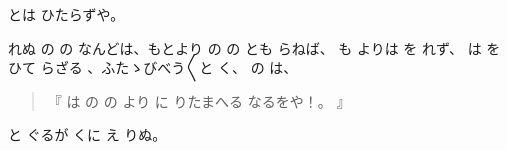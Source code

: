 とは
ひたらずや。

れぬ
の
の
なんどは、もとより
の
の
とも
らねば、
も
よりは
を
れず、
は
を
ひて
らざる
、ふたゝびべう〳〵と
く、
の
は、

\begin{quote}
『
は
の
の
より
に
りたまへる
なるをや！。
』
\end{quote}

と
ぐるが
くに
え
りぬ。


